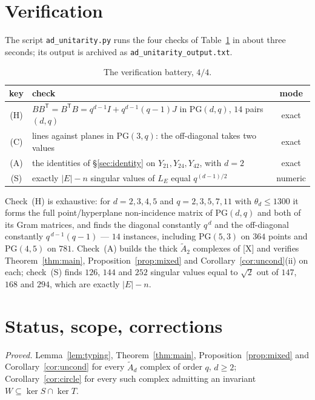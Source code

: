 \documentclass[11pt]{amsart}
\numberwithin{equation}{section}
\theoremstyle{definition}
\theoremstyle{remark}
\newcommand{\Atilde}[1]{\widetilde A_{#1}}
\newcommand{\LE}{L_{E}}
\newcommand{\PG}{\mathrm{PG}}
\begin{document}
\section{Verification}\label{sec:battery}

The script \texttt{ad\_unitarity.py} runs the four checks of Table~\ref{tab:battery} in
about three seconds; its output is archived as \texttt{ad\_unitarity\_output.txt}.

\begin{table}[ht]
\centering\small
\begin{tabular}{clc}
\toprule
key & check & mode\\
\midrule
(H) & $BB^{\mathsf T}=B^{\mathsf T}B=q^{d-1}I+q^{d-1}(q-1)J$ in $\PG(d,q)$, $14$ pairs $(d,q)$ & exact\\
(C) & lines against planes in $\PG(3,q)$: the off-diagonal takes two values & exact\\
(A) & the identities of \S\ref{sec:identity} on $Y_{21},Y_{24},Y_{42}$, with $d=2$ & exact\\
(S) & exactly $|E|-n$ singular values of $\LE$ equal $q^{(d-1)/2}$ & numeric\\
\bottomrule
\end{tabular}
\caption{The verification battery, $4/4$.}
\label{tab:battery}
\end{table}

Check~(H) is exhaustive: for $d=2,3,4,5$ and $q=2,3,5,7,11$ with $\theta_d\le1300$ it
forms the full point/hyperplane non-incidence matrix of $\PG(d,q)$ and both of its Gram
matrices, and finds the diagonal constantly $q^{\,d}$ and the off-diagonal constantly
$q^{\,d-1}(q-1)$ --- $14$ instances, including $\PG(5,3)$ on $364$ points and $\PG(4,5)$ on
$781$. Check~(A) builds the thick $\Atilde2$ complexes of [X] and verifies
Theorem~\ref{thm:main}, Proposition~\ref{prop:mixed} and
Corollary~\ref{cor:uncond}(ii) on each; check~(S) finds $126$, $144$ and $252$ singular
values equal to $\sqrt2$ out of $147$, $168$ and $294$, which are exactly $|E|-n$.

\section{Status, scope, corrections}\label{sec:scope}

\emph{Proved.} Lemma~\ref{lem:typing}, Theorem~\ref{thm:main},
Proposition~\ref{prop:mixed} and Corollary~\ref{cor:uncond} for every $\Atilde d$ complex
of order $q$, $d\ge2$; Corollary~\ref{cor:circle} for every such complex admitting an
invariant $W\subseteq\ker S\cap\ker T$.
\end{document}
